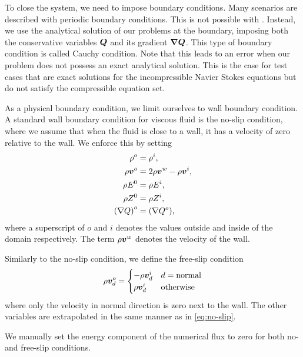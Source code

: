 To close the system, we need to impose boundary conditions.
Many scenarios are described with periodic boundary conditions.
This is not possible with \exahype{}.
Instead, we use the analytical solution of our problems at the boundary, imposing both the conservative variables $\bm{Q}$ and its gradient $\gradQ$.
This type of boundary condition is called Cauchy condition.
Note that this leads to an error when our problem does not possess an exact analytical solution.
This is the case for test cases that are exact solutions for the incompressible Navier Stokes equations but do not satisfy the compressible equation set.

As a physical boundary condition, we limit ourselves to wall boundary condition.
A standard wall boundary condition for viscous fluid is the no-slip condition, where we assume that when the fluid is close to a wall, it has a velocity of zero relative to the wall.
We enforce this by setting
\begin{align}
  \label{eq:no-slip}
  \begin{split}
  \rho^o &= \rho^i, \\
  \rho \bm{v}^o &= 2 \rho \bm{v}^w - \rho \bm{v}^i, \\
  \rho E^0 &= \rho E^i,\\
  \rho Z^0 &= \rho Z^i,\\
  {(\nabla Q)}^o &= {(\nabla Q^o)},
  \end{split}
\end{align}
where a superscript of $o$ and $i$ denotes the values outside and inside of the domain respectively.
The term $\rho \bm{v}^w$ denotes the velocity of the wall.

Similarly to the no-slip condition, we define the free-slip condition
\begin{equation}
  \label{eq:free-slip}
  \rho \bm{v}^o_d = \begin{cases}
    -\rho \bm{v}^i_d & d = \text{normal} \\
    \rho \bm{v}^i_d & \text{otherwise}
    \end{cases}
\end{equation}
where only the velocity in normal direction is zero next to the wall.
The other variables are extrapolated in the same manner as in \cref{eq:no-slip}.

We manually set the energy component of the numerical flux to zero for both no- and free-slip conditions.
